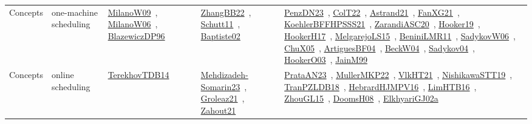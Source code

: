 {\begin{longtable}{lp{3cm}>{\raggedright\arraybackslash}p{6cm}>{\raggedright\arraybackslash}p{6cm}>{\raggedright\arraybackslash}p{8cm}}
Concepts & one-machine scheduling & \href{../works/MilanoW09.pdf}{MilanoW09}~\cite{MilanoW09}, \href{../works/MilanoW06.pdf}{MilanoW06}~\cite{MilanoW06}, \href{../works/BlazewiczDP96.pdf}{BlazewiczDP96}~\cite{BlazewiczDP96} & \href{../works/ZhangBB22.pdf}{ZhangBB22}~\cite{ZhangBB22}, \href{../works/Schutt11.pdf}{Schutt11}~\cite{Schutt11}, \href{../works/Baptiste02.pdf}{Baptiste02}~\cite{Baptiste02} & \href{../works/PenzDN23.pdf}{PenzDN23}~\cite{PenzDN23}, \href{../works/ColT22.pdf}{ColT22}~\cite{ColT22}, \href{../works/Astrand21.pdf}{Astrand21}~\cite{Astrand21}, \href{../works/FanXG21.pdf}{FanXG21}~\cite{FanXG21}, \href{../works/KoehlerBFFHPSSS21.pdf}{KoehlerBFFHPSSS21}~\cite{KoehlerBFFHPSSS21}, \href{../works/ZarandiASC20.pdf}{ZarandiASC20}~\cite{ZarandiASC20}, \href{../works/Hooker19.pdf}{Hooker19}~\cite{Hooker19}, \href{../works/HookerH17.pdf}{HookerH17}~\cite{HookerH17}, \href{../works/MelgarejoLS15.pdf}{MelgarejoLS15}~\cite{MelgarejoLS15}, \href{../works/BeniniLMR11.pdf}{BeniniLMR11}~\cite{BeniniLMR11}, \href{../works/SadykovW06.pdf}{SadykovW06}~\cite{SadykovW06}, \href{../works/ChuX05.pdf}{ChuX05}~\cite{ChuX05}, \href{../works/ArtiguesBF04.pdf}{ArtiguesBF04}~\cite{ArtiguesBF04}, \href{../works/BeckW04.pdf}{BeckW04}~\cite{BeckW04}, \href{../works/Sadykov04.pdf}{Sadykov04}~\cite{Sadykov04}, \href{../works/HookerO03.pdf}{HookerO03}~\cite{HookerO03}, \href{../works/JainM99.pdf}{JainM99}~\cite{JainM99}\\
Concepts & online scheduling & \href{../works/TerekhovTDB14.pdf}{TerekhovTDB14}~\cite{TerekhovTDB14} & \href{../works/Mehdizadeh-Somarin23.pdf}{Mehdizadeh-Somarin23}~\cite{Mehdizadeh-Somarin23}, \href{../works/Groleaz21.pdf}{Groleaz21}~\cite{Groleaz21}, \href{../works/Zahout21.pdf}{Zahout21}~\cite{Zahout21} & \href{../works/PrataAN23.pdf}{PrataAN23}~\cite{PrataAN23}, \href{../works/MullerMKP22.pdf}{MullerMKP22}~\cite{MullerMKP22}, \href{../works/VlkHT21.pdf}{VlkHT21}~\cite{VlkHT21}, \href{../works/NishikawaSTT19.pdf}{NishikawaSTT19}~\cite{NishikawaSTT19}, \href{../works/TranPZLDB18.pdf}{TranPZLDB18}~\cite{TranPZLDB18}, \href{../works/HebrardHJMPV16.pdf}{HebrardHJMPV16}~\cite{HebrardHJMPV16}, \href{../works/LimHTB16.pdf}{LimHTB16}~\cite{LimHTB16}, \href{../works/ZhouGL15.pdf}{ZhouGL15}~\cite{ZhouGL15}, \href{../works/DoomsH08.pdf}{DoomsH08}~\cite{DoomsH08}, \href{../works/ElkhyariGJ02a.pdf}{ElkhyariGJ02a}~\cite{ElkhyariGJ02a}\\

\end{longtable}}

